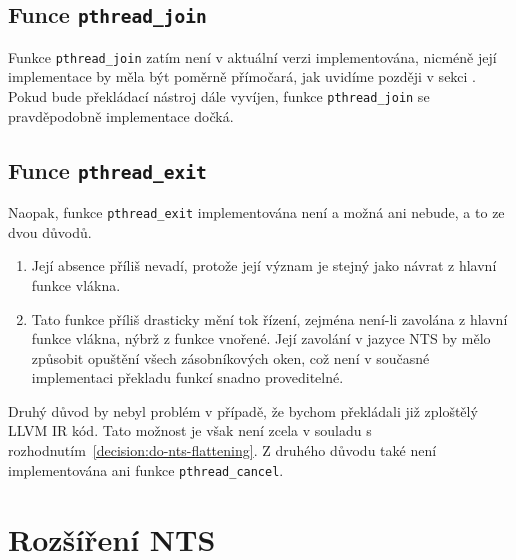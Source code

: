 \documentclass[10pt,a4paper,notitlepage]{report}
\begin{document}
\subsection{Funce \texttt{pthread\_join}}
Funkce \texttt{pthread\_join} zatím není v aktuální verzi implementována, nicméně její implementace by měla být poměrně přímočará, jak uvidíme později v sekci . Pokud bude překládací nástroj dále vyvíjen, funkce \texttt{pthread\_join} se pravděpodobně implementace dočká.

\subsection{Funce \texttt{pthread\_exit}}
Naopak, funkce \texttt{pthread\_exit} implementována není a možná ani nebude, a to ze dvou důvodů.
\begin{enumerate}
\item Její absence příliš nevadí, protože její význam je stejný jako návrat z hlavní funkce vlákna.
\item Tato funkce příliš drasticky mění tok řízení, zejména není-li zavolána z hlavní funkce vlákna, nýbrž z funkce vnořené. Její zavolání v jazyce NTS by mělo způsobit opuštění všech zásobníkových oken, což není v současné implementaci překladu funkcí snadno proveditelné.
\end{enumerate}
Druhý důvod by nebyl problém v případě, že bychom překládali již zploštělý LLVM IR kód. Tato možnost je však není zcela v souladu s rozhodnutím~\ref{decision:do-nts-flattening}. Z druhého důvodu také není implementována ani funkce \texttt{pthread\_cancel}.

\section{Rozšíření NTS}
\end{document}
